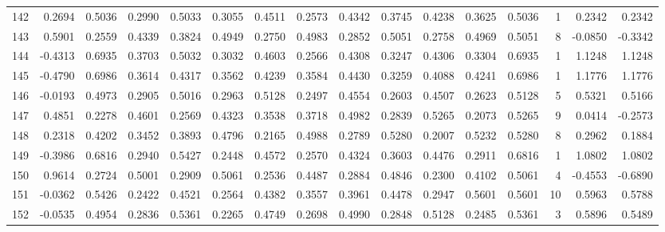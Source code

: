 \begin{tabular}{lrrrrrrrrrrrrrrr}
142 &      0.2694 &  0.5036 &  0.2990 &  0.5033 &  0.3055 &  0.4511 &  0.2573 &  0.4342 &  0.3745 &  0.4238 &   0.3625 &     0.5036 &      1 &                    0.2342 &                     0.2342 \\
143 &      0.5901 &  0.2559 &  0.4339 &  0.3824 &  0.4949 &  0.2750 &  0.4983 &  0.2852 &  0.5051 &  0.2758 &   0.4969 &     0.5051 &      8 &                   -0.0850 &                    -0.3342 \\
144 &     -0.4313 &  0.6935 &  0.3703 &  0.5032 &  0.3032 &  0.4603 &  0.2566 &  0.4308 &  0.3247 &  0.4306 &   0.3304 &     0.6935 &      1 &                    1.1248 &                     1.1248 \\
145 &     -0.4790 &  0.6986 &  0.3614 &  0.4317 &  0.3562 &  0.4239 &  0.3584 &  0.4430 &  0.3259 &  0.4088 &   0.4241 &     0.6986 &      1 &                    1.1776 &                     1.1776 \\
146 &     -0.0193 &  0.4973 &  0.2905 &  0.5016 &  0.2963 &  0.5128 &  0.2497 &  0.4554 &  0.2603 &  0.4507 &   0.2623 &     0.5128 &      5 &                    0.5321 &                     0.5166 \\
147 &      0.4851 &  0.2278 &  0.4601 &  0.2569 &  0.4323 &  0.3538 &  0.3718 &  0.4982 &  0.2839 &  0.5265 &   0.2073 &     0.5265 &      9 &                    0.0414 &                    -0.2573 \\
148 &      0.2318 &  0.4202 &  0.3452 &  0.3893 &  0.4796 &  0.2165 &  0.4988 &  0.2789 &  0.5280 &  0.2007 &   0.5232 &     0.5280 &      8 &                    0.2962 &                     0.1884 \\
149 &     -0.3986 &  0.6816 &  0.2940 &  0.5427 &  0.2448 &  0.4572 &  0.2570 &  0.4324 &  0.3603 &  0.4476 &   0.2911 &     0.6816 &      1 &                    1.0802 &                     1.0802 \\
150 &      0.9614 &  0.2724 &  0.5001 &  0.2909 &  0.5061 &  0.2536 &  0.4487 &  0.2884 &  0.4846 &  0.2300 &   0.4102 &     0.5061 &      4 &                   -0.4553 &                    -0.6890 \\
151 &     -0.0362 &  0.5426 &  0.2422 &  0.4521 &  0.2564 &  0.4382 &  0.3557 &  0.3961 &  0.4478 &  0.2947 &   0.5601 &     0.5601 &     10 &                    0.5963 &                     0.5788 \\
152 &     -0.0535 &  0.4954 &  0.2836 &  0.5361 &  0.2265 &  0.4749 &  0.2698 &  0.4990 &  0.2848 &  0.5128 &   0.2485 &     0.5361 &      3 &                    0.5896 &                     0.5489 \\

\end{tabular}
